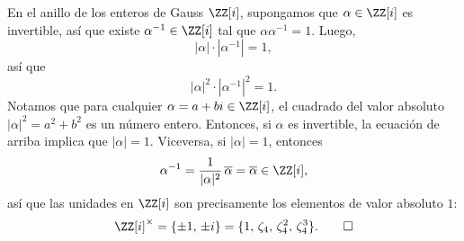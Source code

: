 \begin{ejemplo}
  En el anillo de los enteros de Gauss $\ZZ [i]$, supongamos que
  $\alpha \in \ZZ [i]$ es invertible, así que existe $\alpha^{-1} \in \ZZ [i]$
  tal que $\alpha \alpha^{-1} = 1$. Luego,
  $$|\alpha|\cdot |\alpha^{-1}| = 1,$$
  así que
  $$|\alpha|^2\cdot |\alpha^{-1}|^2 = 1.$$
  Notamos que para cualquier $\alpha = a + bi \in \ZZ [i]$, el cuadrado
  del valor absoluto $|\alpha|^2 = a^2 + b^2$ es un número entero. Entonces, si
  $\alpha$ es invertible, la ecuación de arriba implica que $|\alpha| =
  1$. Viceversa, si $|\alpha| = 1$, entonces
  $$\alpha^{-1} = \frac{1}{|\alpha|^2}\,\overline{\alpha} = \overline{\alpha} \in \ZZ [i],$$
  así que las unidades en $\ZZ [i]$ son precisamente los elementos de valor
  absoluto $1$:
  \[ \ZZ [i]^\times = \{ \pm 1, \, \pm i \} =
    \{ 1, \, \zeta_4, \, \zeta_4^2, \, \zeta_4^3 \}. \qedhere \]
\end{ejemplo}


